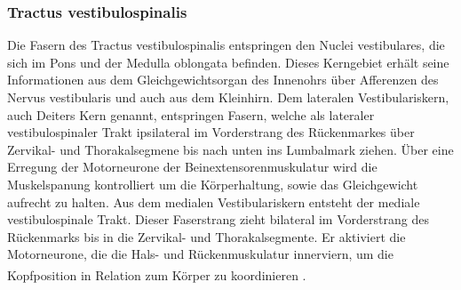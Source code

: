 \documentclass[12pt,a4paper,pdftex]{article}
\begin{document}
\subsubsection{Tractus vestibulospinalis} 
Die Fasern des Tractus vestibulospinalis entspringen den Nuclei vestibulares, die sich im Pons und der Medulla oblongata befinden. Dieses Kerngebiet erhält seine Informationen aus dem Gleichgewichtsorgan des Innenohrs über Afferenzen des Nervus vestibularis und auch aus dem Kleinhirn. Dem lateralen Vestibulariskern, auch Deiters Kern genannt, entspringen Fasern, welche als lateraler vestibulospinaler Trakt ipsilateral im Vorderstrang des Rückenmarkes über Zervikal- und Thorakalsegmene bis nach unten ins Lumbalmark ziehen. Über eine Erregung der Motorneurone der Beinextensorenmuskulatur wird die Muskelspanung kontrolliert um die Körperhaltung, sowie das Gleichgewicht aufrecht zu halten. Aus dem medialen Vestibulariskern entsteht der mediale vestibulospinale Trakt. Dieser Faserstrang zieht bilateral im Vorderstrang des Rückenmarks bis in die Zervikal- und Thorakalsegmente. Er aktiviert die Motorneurone, die die Hals- und Rückenmuskulatur innerviern, um die Kopfposition in Relation zum Körper zu koordinieren \textsuperscript{\cite[14]{neurowissenschaften_baer} \cite[9]{crossman2014neuroanatomy} \cite[8]{paxinos2014rat}}.  
\end{document}
